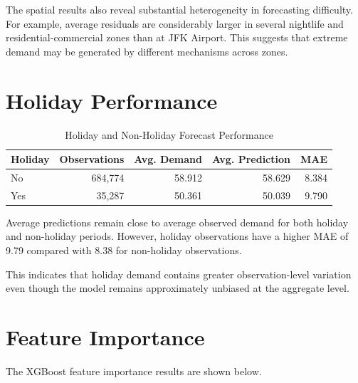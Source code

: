 \documentclass[11pt]{article}
\begin{document}
The spatial results also reveal substantial heterogeneity in
forecasting difficulty. For example, average residuals are
considerably larger in several nightlife and residential-commercial
zones than at JFK Airport. This suggests that extreme demand may be
generated by different mechanisms across zones.


\section{Holiday Performance}

\begin{table}[H]
\centering
\caption{Holiday and Non-Holiday Forecast Performance}
\begin{tabular}{lrrrr}
\toprule
Holiday &
Observations &
Avg. Demand &
Avg. Prediction &
MAE \\
\midrule
No
& 684,774 & 58.912 & 58.629 & 8.384 \\

Yes
& 35,287 & 50.361 & 50.039 & 9.790 \\
\bottomrule
\end{tabular}
\end{table}

Average predictions remain close to average observed demand for both
holiday and non-holiday periods. However, holiday observations have
a higher MAE of 9.79 compared with 8.38 for non-holiday observations.

This indicates that holiday demand contains greater observation-level
variation even though the model remains approximately unbiased at the
aggregate level.


\section{Feature Importance}

The XGBoost feature importance results are shown below.
\end{document}

